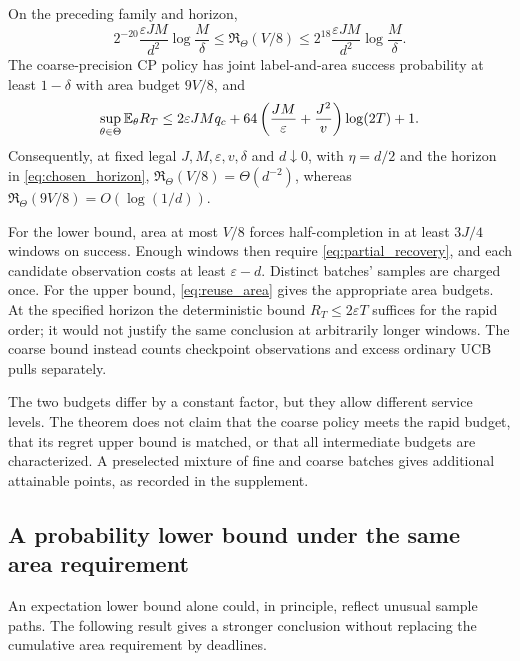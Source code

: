 \documentclass[11pt]{article}
\begin{document}
\begin{theorem}
\label{thm:tradeoff}
On the preceding family and horizon,
\begin{equation}
 2^{-20}\frac{\varepsilon JM}{d^2}\log\frac M\delta
 \le\mathfrak R_\Theta(V/8)\le
 2^{18}\frac{\varepsilon JM}{d^2}\log\frac M\delta.
 \label{eq:rapid_matched}
\end{equation}
The coarse-precision CP policy has joint label-and-area success probability
at least $1-\delta$ with area budget $9V/8$, and
\begin{equation}
 \sup_{\theta\in\Theta}\mathbb E_\theta R_T\le
 2\varepsilon JM q_c+
 64\left(\frac{JM}{\varepsilon}+\frac{J^2}{v}\right)\log(2T)+1.
 \label{eq:coarse_regret}
\end{equation}
Consequently, at fixed legal $J,M,\varepsilon,v,\delta$ and $d\downarrow0$,
with $\eta=d/2$ and the horizon in \eqref{eq:chosen_horizon},
$\mathfrak R_\Theta(V/8)=\Theta(d^{-2})$, whereas
$\mathfrak R_\Theta(9V/8)=O(\log(1/d))$.
\end{theorem}

For the lower bound, area at most $V/8$ forces half-completion in at least
$3J/4$ windows on success. Enough windows then require
\eqref{eq:partial_recovery}, and each candidate observation costs at least
$\varepsilon-d$. Distinct batches' samples are charged once. For the upper
bound, \eqref{eq:reuse_area} gives the appropriate area budgets. At the specified
horizon the deterministic bound $R_T\le2\varepsilon T$ suffices for the rapid
order; it would not justify the same conclusion at arbitrarily longer windows.
The coarse bound instead counts checkpoint observations and excess ordinary
UCB pulls separately.

The two budgets differ by a constant factor, but they allow different service
levels. The theorem does not claim that the coarse policy meets the rapid
budget, that its regret upper bound is matched, or that all intermediate budgets
are characterized. A preselected mixture of fine and coarse batches gives
additional attainable points, as recorded in the supplement.

\subsection{A probability lower bound under the same area requirement}

An expectation lower bound alone could, in principle, reflect unusual sample
paths. The following result gives a stronger conclusion without replacing the
cumulative area requirement by deadlines.
\end{document}

